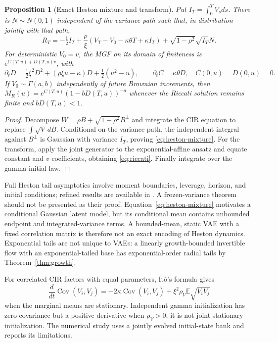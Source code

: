 \documentclass[11pt]{article}
\newtheorem{proposition}[theorem]{Proposition}
\theoremstyle{definition}\newtheorem{definition}[theorem]{Definition}
\theoremstyle{remark}\newtheorem{remark}[theorem]{Remark}
\newcommand{\E}{\mathbb E}\newcommand{\Prob}{\mathbb P}\newcommand{\R}{\mathbb R}
\begin{document}
\begin{proposition}[Exact Heston mixture and transform]\label{prop:heston-transform}
Put $I_T=\int_0^TV_sds$. There is $N\sim N(0,1)$ independent of the variance path such that, in distribution jointly with that path,
\begin{equation}\label{eq:heston-mixture}
R_T=-\tfrac12I_T+\frac{\rho}{\xi}(V_T-V_0-\kappa\theta T+\kappa I_T)
+\sqrt{1-\rho^2}\sqrt{I_T}N.
\end{equation}
For deterministic $V_0=v$, the MGF on its domain of finiteness is $e^{C(T,u)+D(T,u)v}$, with
\begin{equation}\label{eq:riccati}
\partial_tD=\tfrac12\xi^2D^2+(\rho\xi u-\kappa)D+\tfrac12(u^2-u),\qquad
\partial_tC=\kappa\theta D,\quad C(0,u)=D(0,u)=0.
\end{equation}
If $V_0\sim\Gamma(a,b)$ independently of future Brownian increments, then
$M_R(u)=e^{C(T,u)}(1-bD(T,u))^{-a}$ whenever the Riccati solution remains finite and $bD(T,u)<1$.
\end{proposition}
\begin{proof}
Decompose $W=\rho B+\sqrt{1-\rho^2}B^\perp$ and integrate the CIR equation to replace $\int\sqrt V\,dB$. Conditional on the variance path, the independent integral against $B^\perp$ is Gaussian with variance $I_T$, proving \eqref{eq:heston-mixture}. For the transform, apply the joint generator to the exponential-affine ansatz and equate constant and $v$ coefficients, obtaining \eqref{eq:riccati}. Finally integrate over the gamma initial law.
\end{proof}

Full Heston tail asymptotics involve moment boundaries, leverage, horizon, and initial conditions; refined results are available in \citet{friz2011heston}. A frozen-variance theorem should not be presented as their proof. Equation~\eqref{eq:heston-mixture} motivates a conditional Gaussian latent model, but its conditional mean contains unbounded endpoint and integrated-variance terms. A bounded-mean, static VAE with a fixed correlation matrix is therefore not an exact encoding of Heston dynamics. Exponential tails are not unique to VAEs: a linearly growth-bounded invertible flow with an exponential-tailed base has exponential-order radial tails by Theorem~\ref{thm:growth}.

For correlated CIR factors with equal parameters, It\^o's formula gives
\begin{equation}\label{eq:variance-cov}
\frac{d}{dt}\operatorname{Cov}(V_i,V_j)
=-2\kappa\operatorname{Cov}(V_i,V_j)
+\xi^2\rho_V\E\sqrt{V_iV_j}
\end{equation}
when the marginal means are stationary. Independent gamma initialization has zero covariance but a positive derivative when $\rho_V>0$; it is not joint stationary initialization. The numerical study uses a jointly evolved initial-state bank and reports its limitations.
\end{document}
